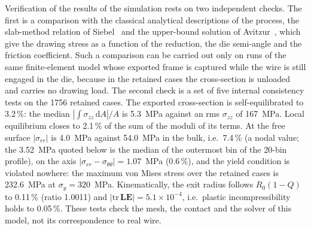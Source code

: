 Verification of the results of the simulation rests on two independent checks. The first is a comparison with the classical analytical descriptions of the process, the slab-method relation of Siebel~\cite{TODO-siebel} and the upper-bound solution of Avitzur~\cite{TODO-avitzur}, which give the drawing stress as a function of the reduction, the die semi-angle and the friction coefficient. Such a comparison can be carried out only on runs of the same finite-element model whose exported frame is captured while the wire is still engaged in the die, because in the retained cases the cross-section is unloaded and carries no drawing load. %
The second check is a set of five internal consistency tests on the 1756 retained cases. The exported cross-section is self-equilibrated to 3.2\,\%: the median $|\int\sigma_{zz}\,\mathrm{d}A|/A$ is 5.3~MPa against an rms $\sigma_{zz}$ of 167~MPa. %
Local equilibrium closes to 2.1\,\% of the sum of the moduli of its terms. %
At the free surface $|\sigma_{rr}|$ is 4.0~MPa against 54.0~MPa in the bulk, i.e.\ 7.4\,\% (a nodal value; the 3.52~MPa quoted below is the median of the outermost bin of the 20-bin profile), %
on the axis $|\sigma_{rr}-\sigma_{\theta\theta}| = 1.07$~MPa (0.6\,\%), %
and the yield condition is violated nowhere: the maximum von Mises stress over the retained cases is 232.6~MPa at $\sigma_y = 320$~MPa. %
Kinematically, the exit radius follows $R_0(1-Q)$ to 0.11\,\% (ratio 1.0011) and $|\mathrm{tr}\,\mathbf{LE}| = 5.1\times10^{-4}$, i.e.\ plastic incompressibility holds to 0.05\,\%. %
These tests check the mesh, the contact and the solver of this model, not its correspondence to real wire. %


